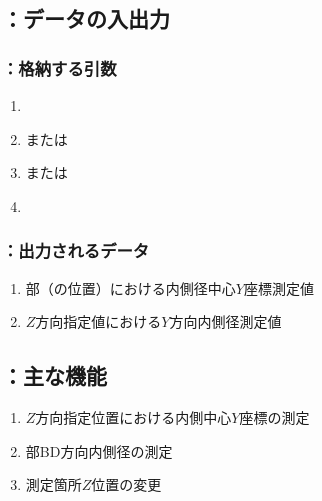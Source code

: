 \subsection{\MYIWidth：データの入出力}

\subsubsection{\MYIWidth：格納する引数}
\begin{enumerate}[label*=\sarrow]
\item \PMBDOD
\item \PMTopEndBDID または\PMBottomEndBDID
\item \PMTopReAlocationLength または\PMBottomReAlocationLength
\item \PMPlatingThk
\end{enumerate}

\subsubsection{\MYIWidth：出力されるデータ}
\begin{enumerate}[label*=\sarrow]
\item \EndFace 部（\ReAlocationLength の位置）における内側径中心$Y$座標測定値
\item $Z$方向指定値における$Y$方向内側径測定値
\end{enumerate}



\subsection{\MYIWidth：主な機能}
\begin{enumerate}[label*=\sarrow]
\item $Z$方向指定位置における内側中心$Y$座標の測定
\item \EndFace 部BD方向内側径の測定
\item 測定箇所$Z$位置の変更
\end{enumerate}


